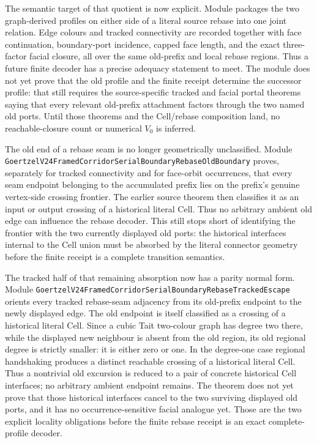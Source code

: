 \documentclass[11pt]{article}
\theoremstyle{definition}
\begin{document}
The semantic target of that quotient is now explicit.  Module
packages the two graph-derived profiles on either side of a literal source
rebase into one joint relation.  Edge colours and tracked connectivity are
recorded together with face continuation, boundary-port incidence, capped
face length, and the exact three-factor facial closure, all over the same
old-prefix and local rebase regions.  Thus a future finite decoder has a
precise adequacy statement to meet.  The module does not yet prove that the
old profile and the finite receipt determine the successor profile: that
still requires the source-specific tracked and facial portal theorems saying
that every relevant old-prefix attachment factors through the two named old
ports.  Until those theorems and the Cell/rebase composition land, no
reachable-closure count or numerical $V_0$ is inferred.

The old end of a rebase seam is no longer geometrically unclassified.
Module
\texttt{GoertzelV24FramedCorridorSerialBoundaryRebaseOldBoundary}
proves, separately for tracked connectivity and for face-orbit occurrences,
that every seam endpoint belonging to the accumulated prefix lies on the
prefix's genuine vertex-side crossing frontier.  The earlier source theorem
then classifies it as an input or output crossing of a historical literal
Cell.  Thus no arbitrary ambient old edge can influence the rebase decoder.
This still stops short of identifying the frontier with the two currently
displayed old ports: the historical interfaces internal to the Cell union
must be absorbed by the literal connector geometry before the finite receipt
is a complete transition semantics.

The tracked half of that remaining absorption now has a parity normal form.
Module
\texttt{GoertzelV24FramedCorridorSerialBoundaryRebaseTrackedEscape}
orients every tracked rebase-seam adjacency from its old-prefix endpoint to
the newly displayed edge.  The old endpoint is itself classified as a
crossing of a historical literal Cell.  Since a cubic Tait two-colour graph
has degree two there, while the displayed new neighbour is absent from the
old region, its old regional degree is strictly smaller: it is either zero or
one.  In the degree-one case regional handshaking produces a distinct
reachable crossing of a historical literal Cell.  Thus a nontrivial old
excursion is reduced to a pair of concrete historical Cell interfaces; no
arbitrary ambient endpoint remains.  The theorem does not yet prove that
those historical interfaces cancel to the two surviving displayed old
ports, and it has no occurrence-sensitive facial analogue yet.  Those are
the two explicit locality obligations before the finite rebase receipt is an
exact complete-profile decoder.
\end{document}
